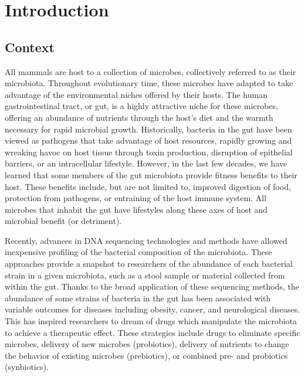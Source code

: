 \documentclass[11pt,twocolumn,notitlepage,openany,twoside]{book}
\begin{document}
\chapter{Introduction}
\begin{refsection}

\section{Context}

All mammals are host to a collection of microbes, collectively referred to as their microbiota. Throughout evolutionary time, these microbes have adapted to take advantage of the environmental niches offered by their hosts. The human gastrointestinal tract, or gut, is a highly attractive niche for these microbes, offering an abundance of nutrients through the host’s diet and the warmth necessary for rapid microbial growth. Historically, bacteria in the gut have been viewed as pathogens that take advantage of host resources, rapidly growing and wreaking havoc on host tissue through toxin production, disruption of epithelial barriers, or an intracellular lifestyle. However, in the last few decades, we have learned that some members of the gut microbiota provide fitness benefits to their host. These benefits include, but are not limited to, improved digestion of food, protection from pathogens, or entraining of the host immune system. All microbes that inhabit the gut have lifestyles along these axes of host and microbial benefit (or detriment).

Recently, advances in DNA sequencing technologies and methods have allowed inexpensive profiling of the bacterial composition of the microbiota. These approaches provide a snapshot to researchers of the abundance of each bacterial strain in a given microbiota, such as a stool sample or material collected from within the gut. Thanks to the broad application of these sequencing methods, the abundance of some strains of bacteria in the gut has been associated with variable outcomes for diseases including obesity, cancer, and neurological diseases. This has inspired researchers to dream of drugs which manipulate the microbiota to achieve a therapeutic effect. These strategies include drugs to eliminate specific microbes, delivery of new microbes (probiotics), delivery of nutrients to change the behavior of existing microbes (prebiotics), or combined pre- and probiotics (synbiotics).


\end{refsection}
\end{document}
